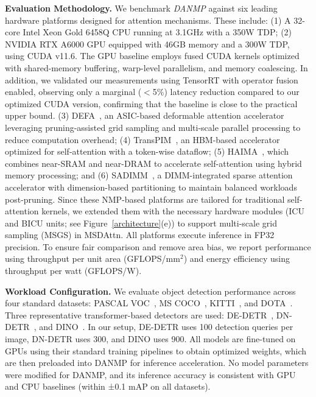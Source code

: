 \documentclass[sigconf]{acmart}
\begin{document}
{\bf Evaluation Methodology.} We benchmark \textit{DANMP} against {six} leading hardware platforms designed for attention mechanisms. These include: (1) A 32-core Intel Xeon Gold 6458Q CPU running at 3.1GHz with a 350W TDP; (2) NVIDIA RTX A6000 GPU equipped with 46GB memory and a 300W TDP, using CUDA v11.6. 
{The GPU baseline employs fused CUDA kernels optimized with shared-memory buffering, warp-level parallelism, and memory coalescing. In addition, we validated our measurements using TensorRT with operator fusion enabled, observing only a marginal ($<$5\%) latency reduction compared to our optimized CUDA version, confirming that the baseline is close to the practical upper bound.}
{(3) DEFA~\cite{xu2024defa}, an ASIC-based deformable attention accelerator leveraging pruning-assisted grid sampling and multi-scale parallel processing to reduce computation overhead;} 
(4) TransPIM~\cite{Zhou2022}, an HBM-based accelerator optimized for self-attention with a token-wise dataflow; 
{(5) HAIMA~\cite{Ding2023}, which combines near-SRAM and near-DRAM to accelerate self-attention using hybrid memory processing; and (6) SADIMM~\cite{sadimm2025}, a DIMM-integrated sparse attention accelerator with dimension-based partitioning to maintain balanced workloads post-pruning.} 
{Since these NMP-based platforms are tailored for traditional self-attention kernels, we extended them with the necessary hardware modules (ICU and BICU units; see Figure~\ref{architecture}(e)) to support multi-scale grid sampling (MSGS) in MSDAttn. All platforms execute inference in FP32 precision. To ensure fair comparison and remove area bias, we report performance using throughput per unit area (GFLOPS/mm$^2$) and energy efficiency using throughput per watt (GFLOPS/W).}

{\bf Workload Configuration.} We evaluate object detection performance across four standard datasets: PASCAL VOC~\cite{everingham2010pascal}, MS COCO~\cite{Lin2014}, KITTI~\cite{kitti2013vision}, and DOTA~\cite{xia2018dota}. Three representative transformer-based detectors are used: DE-DETR~\cite{zhu2021deformable}, DN-DETR~\cite{Li_2022_CVPR}, and DINO~\cite{zhang2023dino}. In our setup, DE-DETR uses 100 detection queries per image, DN-DETR uses 300, and DINO uses 900. {All models are fine-tuned on GPUs using their standard training pipelines to obtain optimized weights, which are then preloaded into DANMP for inference acceleration. No model parameters were modified for DANMP, and its inference accuracy is consistent with GPU and CPU baselines (within ±0.1 mAP on all datasets).}
\end{document}
